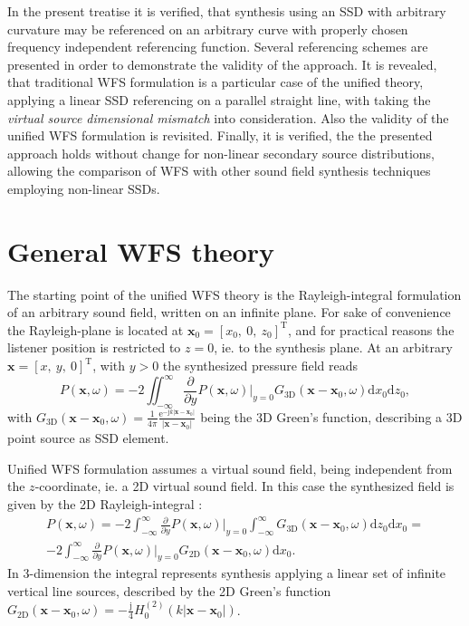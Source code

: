 \documentclass[12pt,a4paper]{article}
\newcommand{\td}{\mathrm{d}}
\newcommand{\te}{\mathrm{e}}
\newcommand{\ti}{\mathrm{j}}
\newcommand{\vx}{\mathbf{x}}
\newcommand{\vxo}{\mathbf{x}_0}
\begin{document}
In the present treatise it is verified, that synthesis using an SSD with arbitrary curvature may be referenced on an arbitrary curve with properly chosen frequency independent referencing function. Several referencing schemes are presented in order to demonstrate the validity of the approach. It is revealed, that traditional WFS formulation is a particular case of the unified theory, applying a linear SSD referencing on a parallel straight line, with taking the \emph{virtual source dimensional mismatch} into consideration.
Also the validity of the unified WFS formulation is revisited.
Finally, it is verified, the the presented approach holds without change for non-linear secondary source distributions, allowing the comparison of WFS with other sound field synthesis techniques employing non-linear SSDs.

\section{General WFS theory}
The starting point of the unified WFS theory is the Rayleigh-integral formulation of an arbitrary sound field, written on an infinite plane. For sake of convenience the Rayleigh-plane is located at $\vxo = [x_0,\ 0,\ z_0]^{\mathrm{T}}$, and for practical reasons the listener position is restricted to $z=0$, ie. to the synthesis plane. At an arbitrary $\vx = [x,\ y,\ 0]^{\mathrm{T}}$, with $y>0$ the synthesized pressure field reads
\begin{equation}
P(\vx,\omega) = -2 \iint_{-\infty}^{\infty} \frac{\partial}{\partial y} \left. P(\vx,\omega) \right|_{y = 0} G_{3\mathrm{D}}(\vx - \vxo,\omega) \td x_0 \td z_0,
\label{Eq:Theory:3D_Rayleigh}
\end{equation}
with $G_{3\mathrm{D}}(\vx - \vxo,\omega) = \frac{1}{4\pi} \frac{\te^{-\ti k |\vx-\vxo| }}{|\vx-\vxo|}$ being the 3D Green's function, describing a 3D point source as SSD element.

% 
Unified WFS formulation assumes a virtual sound field, being independent from the $z$-coordinate, ie. a 2D virtual sound field. In this case the synthesized field is given by the 2D Rayleigh-integral \cite{Spors2008:WFSrevisited}:
\begin{multline}
P(\vx,\omega) = -2 \int_{-\infty}^{\infty} \frac{\partial}{\partial y} \left. P(\vx,\omega) \right|_{y = 0} 
\int_{-\infty}^{\infty} G_{3\mathrm{D}}(\vx - \vxo,\omega) \td z_0 \td x_0 = \\
-2 \int_{-\infty}^{\infty} \frac{\partial}{\partial y} \left. P(\vx,\omega) \right|_{y = 0} G_{2\mathrm{D}}(\vx - \vxo,\omega) \td x_0.
\label{Eq:2D_Rayleigh}
\end{multline}
In 3-dimension the integral represents synthesis applying a linear set of infinite vertical line sources, described by the 2D Green's function $G_{2\mathrm{D}}(\vx - \vxo,\omega) = -\frac{\ti}{4} H_0^{(2)}\left( k |\vx-\vxo| \right)$.
\end{document}

